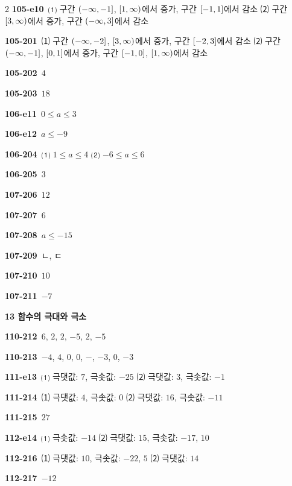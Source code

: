 \documentclass[10pt,a4paper]{article}
\begin{document}
\begin{multicols}{2}
\noindent\textbf{105-e10}\ ⑴ 구간 $(-\infty{,}\mkern3mu\mathopen{}-1]$, $[1{,}\mkern3mu\mathopen{}\infty)$에서 증가, 구간 $[-1{,}\mkern3mu\mathopen{}1]$에서 감소 ⑵ 구간 $[3{,}\mkern3mu\mathopen{}\infty)$에서 증가, 구간 $(-\infty{,}\mkern3mu\mathopen{}3]$에서 감소\par
\noindent\textbf{105-201}\ ⑴ 구간 $(-\infty{,}\mkern3mu\mathopen{}-2]$, $[3{,}\mkern3mu\mathopen{}\infty)$에서 증가, 구간 $[-2{,}\mkern3mu\mathopen{}3]$에서 감소 ⑵ 구간 $(-\infty{,}\mkern3mu\mathopen{}-1]$, $[0{,}\mkern3mu\mathopen{}1]$에서 증가, 구간 $[-1{,}\mkern3mu\mathopen{}0]$, $[1{,}\mkern3mu\mathopen{}\infty)$에서 감소\par
\noindent\textbf{105-202}\ $4$\par
\noindent\textbf{105-203}\ $18$\par
\noindent\textbf{106-e11}\ $0\le a\le 3$\par
\noindent\textbf{106-e12}\ $a\le -9$\par
\noindent\textbf{106-204}\ ⑴ $1\le a\le 4$ ⑵ $-6\le a\le 6$\par
\noindent\textbf{106-205}\ $3$\par
\noindent\textbf{107-206}\ $12$\par
\noindent\textbf{107-207}\ $6$\par
\noindent\textbf{107-208}\ $a\le -15$\par
\noindent\textbf{107-209}\ ㄴ, ㄷ\par
\noindent\textbf{107-210}\ $10$\par
\noindent\textbf{107-211}\ $-7$\par
\noindent\textbf{13 함수의 극대와 극소}\par\smallskip
\noindent\textbf{110-212}\ $6$, $2$, $2$, $-5$, $2$, $-5$\par
\noindent\textbf{110-213}\ $-4$, $4$, $0$, $0$, $-$, $-3$, $0$, $-3$\par
\noindent\textbf{111-e13}\ ⑴ 극댓값: $7$, 극솟값: $-25$ ⑵ 극댓값: $3$, 극솟값: $-1$\par
\noindent\textbf{111-214}\ ⑴ 극댓값: $4$, 극솟값: $0$ ⑵ 극댓값: $16$, 극솟값: $-11$\par
\noindent\textbf{111-215}\ $27$\par
\noindent\textbf{112-e14}\ ⑴ 극솟값: $-14$ ⑵ 극댓값: $15$, 극솟값: $-17$, $10$\par
\noindent\textbf{112-216}\ ⑴ 극댓값: $10$, 극솟값: $-22$, $5$ ⑵ 극댓값: $14$\par
\noindent\textbf{112-217}\ $-12$\par

\end{multicols}
\end{document}
